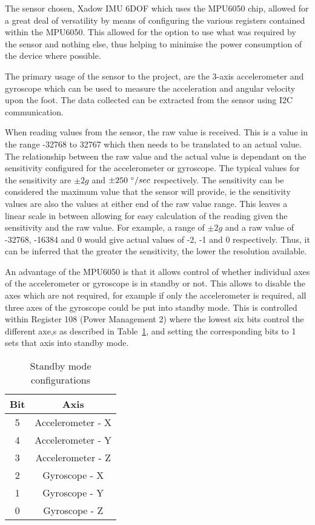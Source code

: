 
The sensor chosen, Xadow IMU 6DOF which uses the MPU6050 chip, allowed for a great deal of versatility by means of configuring the various registers contained within the MPU6050. This allowed for the option to use what was required by the sensor and nothing else, thus helping to minimise the power consumption of the device where possible. \cite{sensor_specs}

The primary usage of the sensor to the project, are the 3-axis accelerometer and gyroscope which can be used to measure the acceleration and angular velocity upon the foot. The data collected can be extracted from the sensor using I2C communication. 

When reading values from the sensor, the raw value is received. This is a value in the range -32768 to 32767 which then needs to be translated to an actual value. The relationship between the raw value and the actual value is dependant on the sensitivity configured for the accelerometer or gyroscope. The typical values for the sensitivity are $\pm 2g$ and $\pm 250~\degree / sec$ respectively. The sensitivity can be considered the maximum value that the sensor will provide, ie the sensitivity values are also the values at either end of the raw value range. This leaves a linear scale in between allowing for easy calculation of the reading given the sensitivity and the raw value. For example, a range of $\pm 2g$ and a raw value of -32768, -16384 and 0 would give actual values of -2, -1 and 0 respectively. Thus, it can be inferred that the greater the sensitivity, the lower the resolution available. \cite{sensor_raw_explanation}

An advantage of the MPU6050 is that it allows control of whether individual axes of the accelerometer or gyroscope is in standby or not. This allows to disable the axes which are not required, for example if only the accelerometer is required, all three axes of the gyroscope could be put into standby mode. This is controlled within Register 108 (Power Management 2) where the lowest six bits control the different axe,s as described in Table~\ref{tab:sensor:power}, and setting the corresponding bits to 1 sets that axis into standby mode.

\begin{table}
	\centering
	\begin{tabular}{|c|c|}
		\hline
		Bit & Axis \\
		\hline
		5 & Accelerometer - X \\
		4 & Accelerometer - Y \\
		3 & Accelerometer - Z \\
		2 & Gyroscope - X \\
		1 & Gyroscope - Y \\
		0 & Gyroscope - Z \\
		\hline
	\end{tabular}
	\caption{Standby mode configurations}
	\label{tab:sensor:power}
\end{table}

